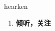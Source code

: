 
\begin{frame}
{\huge hearken}
\begin{center}
\begin{enumerate}\Large
  \item \textbf{倾听，关注}
\end{enumerate}
\end{center}
\end{frame}
